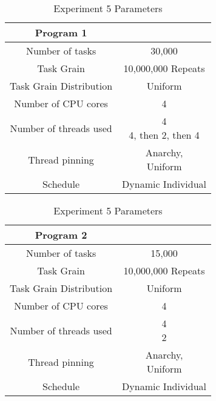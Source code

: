 \begin{table}
\centering
 \begin{tabular}{|c|c|}
  \hline
  Program 1 & \\
  \hline
  Number of tasks & 30,000 \\
  \hline
  Task Grain & 10,000,000 Repeats \\
  \hline
  Task Grain Distribution & Uniform \\
  \hline
  Number of CPU cores & 4 \\
  \hline
  Number of threads used & \specialcell{4 \\ 4, then 2, then 4} \\
  \hline
  Thread pinning & \specialcell{Anarchy, \\ Uniform} \\
  \hline
  Schedule & Dynamic Individual \\
  \hline
 \end{tabular}

 \begin{tabular}{|c|c|}
  \hline
  Program 2 & \\
  \hline
  Number of tasks & 15,000 \\
  \hline
  Task Grain & 10,000,000 Repeats \\
  \hline
  Task Grain Distribution & Uniform \\
  \hline
  Number of CPU cores & 4 \\
  \hline
  Number of threads used & \specialcell{4 \\ 2} \\
  \hline
  Thread pinning & \specialcell{Anarchy, \\ Uniform} \\
  \hline
  Schedule & Dynamic Individual \\
  \hline
 \end{tabular}
\caption{Experiment 5 Parameters}
\iflabele
\label{table:evaluation_ex5_parameters}
\fi
{}
\end{table}

